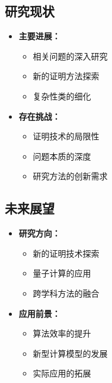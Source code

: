 \documentclass[a4paper,12pt]{ctexart}
\begin{document}
\subsection{研究现状}
\begin{itemize}
    \item \textbf{主要进展：}
        \begin{itemize}
            \item 相关问题的深入研究
            \item 新的证明方法探索
            \item 复杂性类的细化
        \end{itemize}
    \item \textbf{存在挑战：}
        \begin{itemize}
            \item 证明技术的局限性
            \item 问题本质的深度
            \item 研究方法的创新需求
        \end{itemize}
\end{itemize}

\subsection{未来展望}
\begin{itemize}
    \item \textbf{研究方向：}
        \begin{itemize}
            \item 新的证明技术探索
            \item 量子计算的应用
            \item 跨学科方法的融合
        \end{itemize}
    \item \textbf{应用前景：}
        \begin{itemize}
            \item 算法效率的提升
            \item 新型计算模型的发展
            \item 实际应用的拓展
        \end{itemize}
\end{itemize}
\end{document}

